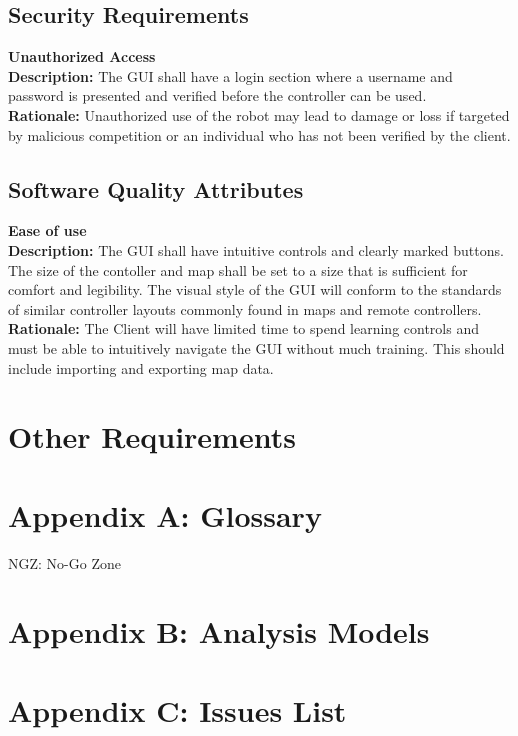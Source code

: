 \documentclass[10pt,a4paper,titlepage]{article}
\begin{document}
	\subsection{Security Requirements}
		\textbf {Unauthorized Access}\\

		\textbf {Description:} The GUI shall have a login section where a username and password is presented and verified before the controller can be used.\\
		\textbf{Rationale:} Unauthorized use of the robot may lead to damage or loss if targeted by malicious competition or an individual who has not been verified by the client.\\
 
	\subsection{Software Quality Attributes}
		
		\textbf {Ease of use}\\
		\textbf {Description:} The GUI shall have intuitive controls and clearly marked buttons. The size of the contoller and map shall be set to a size that is sufficient for comfort and legibility. The visual style of the GUI will conform to the standards of similar controller layouts commonly found in maps and remote controllers.\\
		\textbf {Rationale:} The Client will have limited time to spend learning controls and must be able to intuitively navigate the GUI without much training. This should include importing and exporting map data.\\

	\section{Other Requirements}

	\section{Appendix A: Glossary}
		NGZ: No-Go Zone

	\section{Appendix B: Analysis Models}

	\section{Appendix C: Issues List}
\end{document}
